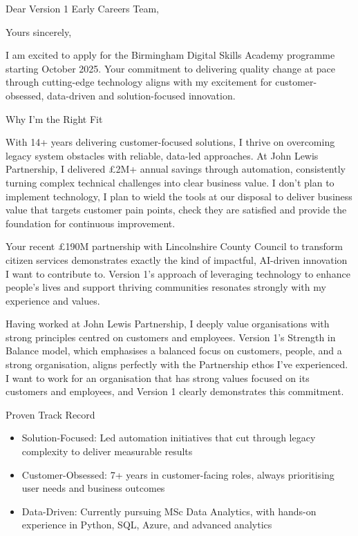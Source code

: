 \documentclass[11pt, a4paper]{moderncv}
\begin{document}
\recipient{\textcolor{VividPurple}{Early Careers Recruitment Team}}{\textcolor{VividPurple}{Version 1\\Birmingham Digital Skills Academy\\Birmingham, United Kingdom}}
\date{\textcolor{VividPurple}{\today}}
\opening{Dear Version 1 Early Careers Team,}
\closing{Yours sincerely,}

\makelettertitle

I am excited to apply for the Birmingham Digital Skills Academy programme starting October 2025. Your commitment to delivering quality change at pace through cutting-edge technology aligns with my excitement for customer-obsessed, data-driven and solution-focused innovation.

\textcolor{VividPurple}{Why I'm the Right Fit}

With 14+ years delivering customer-focused solutions, I thrive on overcoming legacy system obstacles with reliable, data-led approaches. At John Lewis Partnership, I delivered \textcolor{VividPurple}{£2M+ annual savings} through automation, consistently turning complex technical challenges into clear business value. I don't plan to implement technology, I plan to wield the tools at our disposal to deliver business value that targets customer pain points, check they are satisfied and provide the foundation for continuous improvement.

Your recent £190M partnership with Lincolnshire County Council to transform citizen services demonstrates exactly the kind of impactful, AI-driven innovation I want to contribute to. Version 1's approach of leveraging technology to enhance people's lives and support thriving communities resonates strongly with my experience and values.

Having worked at John Lewis Partnership, I deeply value organisations with strong principles centred on customers and employees. Version 1's Strength in Balance model, which emphasises a balanced focus on customers, people, and a strong organisation, aligns perfectly with the Partnership ethos I've experienced. I want to work for an organisation that has strong values focused on its customers and employees, and Version 1 clearly demonstrates this commitment.

\textcolor{VividPurple}{Proven Track Record}

\begin{itemize}
\item \textcolor{VividPurple}{Solution-Focused:} Led automation initiatives that cut through legacy complexity to deliver measurable results
\item \textcolor{VividPurple}{Customer-Obsessed:} 7+ years in customer-facing roles, always prioritising user needs and business outcomes  
\item \textcolor{VividPurple}{Data-Driven:} Currently pursuing MSc Data Analytics, with hands-on experience in Python, SQL, Azure, and advanced analytics
\end{itemize}
\end{document}
